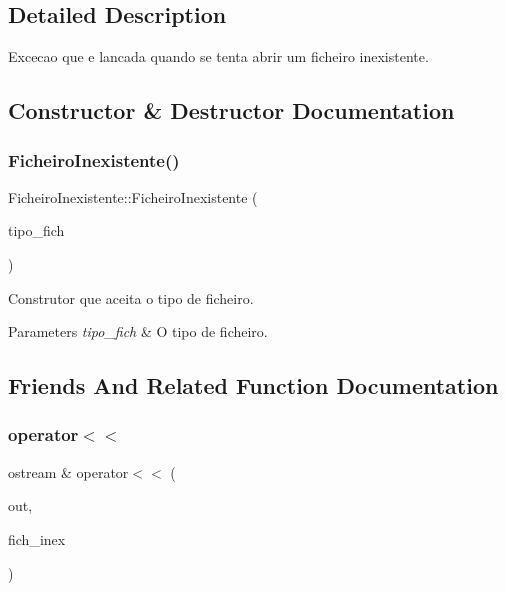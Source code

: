 \subsection{Detailed Description}
Excecao que e lancada quando se tenta abrir um ficheiro inexistente. 

\subsection{Constructor \& Destructor Documentation}
\hypertarget{class_ficheiro_inexistente_a9ea81e48a74c65bcd6b15216d57bc503}{}\label{class_ficheiro_inexistente_a9ea81e48a74c65bcd6b15216d57bc503} 
\subsubsection{\texorpdfstring{Ficheiro\+Inexistente()}{FicheiroInexistente()}}
{\footnotesize\ttfamily Ficheiro\+Inexistente\+::\+Ficheiro\+Inexistente (\begin{DoxyParamCaption}\item[{string}]{tipo\+\_\+fich }\end{DoxyParamCaption})}



Construtor que aceita o tipo de ficheiro. 


\begin{DoxyParams}{Parameters}
{\em tipo\+\_\+fich} & O tipo de ficheiro. \\
\hline
\end{DoxyParams}


\subsection{Friends And Related Function Documentation}
\hypertarget{class_ficheiro_inexistente_a28e61dd2982f9766b4d8a1615208033e}{}\label{class_ficheiro_inexistente_a28e61dd2982f9766b4d8a1615208033e} 
\subsubsection{\texorpdfstring{operator$<$$<$}{operator<<}}
{\footnotesize\ttfamily ostream \& operator$<$$<$ (\begin{DoxyParamCaption}\item[{ostream \&}]{out,  }\item[{const \hyperlink{class_ficheiro_inexistente}{Ficheiro\+Inexistente} \&}]{fich\+\_\+inex }\end{DoxyParamCaption})\hspace{0.3cm}{\ttfamily [friend]}}




